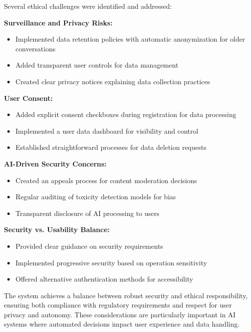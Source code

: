 \documentclass{article}
\begin{document}
Several ethical challenges were identified and addressed:

\textbf{Surveillance and Privacy Risks:}

\begin{itemize}
    \item Implemented data retention policies with automatic anonymization for older conversations
    \item Added transparent user controls for data management
    \item Created clear privacy notices explaining data collection practices
\end{itemize}

\textbf{User Consent:}

\begin{itemize}
    \item Added explicit consent checkboxes during registration for data processing
    \item Implemented a user data dashboard for visibility and control
    \item Established straightforward processes for data deletion requests
\end{itemize}

\textbf{AI-Driven Security Concerns:}

\begin{itemize}
    \item Created an appeals process for content moderation decisions
    \item Regular auditing of toxicity detection models for bias
    \item Transparent disclosure of AI processing to users
\end{itemize}

\textbf{Security vs. Usability Balance:}

\begin{itemize}
    \item Provided clear guidance on security requirements
    \item Implemented progressive security based on operation sensitivity
    \item Offered alternative authentication methods for accessibility
\end{itemize}

The system achieves a balance between robust security and ethical responsibility, ensuring both compliance with regulatory requirements and respect for user privacy and autonomy. These considerations are particularly important in AI systems where automated decisions impact user experience and data handling.
\end{document}
